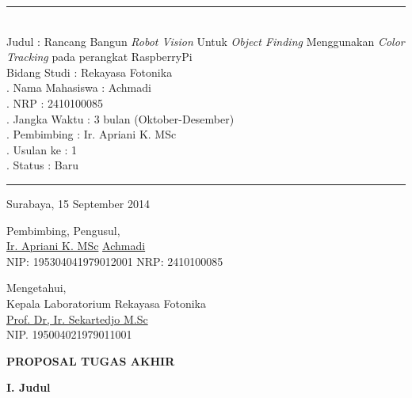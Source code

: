 \documentclass[a4paper,12pt]{article}
\begin{document}
\rule{385pt}{5pt}\\
\noindent Judul \hspace{80pt} : Rancang Bangun \textit{Robot Vision} Untuk \textit{Object Finding} Menggunakan \textit{Color Tracking} pada perangkat RaspberryPi\\[5pt]
\noindent Bidang Studi \hspace{42pt} : Rekayasa Fotonika\\[5pt]
. Nama Mahasiswa \hspace{5pt} : Achmadi\\[5pt]
. NRP  \hspace{70pt} : 2410100085\\[5pt]
. Jangka Waktu \hspace{20pt} : 3 bulan (Oktober-Desember)\\[5pt]
. Pembimbing \hspace{28pt} : Ir. Apriani K. MSc\\[5pt]
. Usulan ke \hspace{40pt} : 1\\[5pt]
. Status \hspace{60pt} : Baru\\[5pt]
\rule{385pt}{5pt}
\begin{flushright}
  Surabaya, 15 September 2014
\end{flushright}
\begin{flushleft}
Pembimbing, \hspace{230pt} Pengusul, 
\\[40pt]
\underline{Ir. Apriani K. MSc} \hspace{200pt} \underline{Achmadi}\\
NIP: 195304041979012001 \hspace{150pt} NRP: 2410100085
\\[40pt]
\end{flushleft}
\begin{center}
  Mengetahui,\\
  Kepala Laboratorium Rekayasa Fotonika
  \\[40pt]
  \underline{Prof. Dr, Ir. Sekartedjo M.Sc}\\
  NIP. 195004021979011001
\end{center}
\newpage
\begin{center}
 \textbf{PROPOSAL TUGAS AKHIR}
\end{center}
\noindent \textbf{I. \hspace{10pt} Judul}
\end{document}
